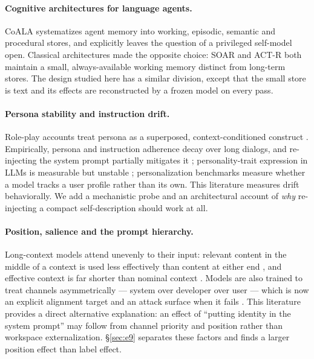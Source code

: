 \documentclass[11pt]{article}
\begin{document}
\paragraph{Cognitive architectures for language agents.} CoALA \citep{sumers2024coala} systematizes agent memory into working, episodic, semantic and procedural stores, and explicitly leaves the question of a privileged self-model open. Classical architectures made the opposite choice: SOAR \citep{laird2012soar} and ACT-R \citep{anderson2004actr} both maintain a small, always-available working memory distinct from long-term stores. The design studied here has a similar division, except that the small store is text and its effects are reconstructed by a frozen model on every pass.

\paragraph{Persona stability and instruction drift.} Role-play accounts treat persona as a superposed, context-conditioned construct \citep{shanahan2023}. Empirically, persona and instruction adherence decay over long dialogs, and re-injecting the system prompt partially mitigates it \citep{li2024stability}; personality-trait expression in LLMs is measurable but unstable \citep{serapio2023personality,jiang2024personallm}; personalization benchmarks \citep{salemi2024lamp} measure whether a model tracks a user profile rather than its own. This literature measures drift behaviorally. We add a mechanistic probe and an architectural account of \emph{why} re-injecting a compact self-description should work at all.

\paragraph{Position, salience and the prompt hierarchy.} Long-context models attend unevenly to their input: relevant content in the middle of a context is used less effectively than content at either end \citep{liu2024lost}, and effective context is far shorter than nominal context \citep{hsieh2024ruler}. Models are also trained to treat channels asymmetrically --- system over developer over user --- which is now an explicit alignment target \citep{wallace2024hierarchy} and an attack surface when it fails \citep{greshake2023injection}. This literature provides a direct alternative explanation: an effect of ``putting identity in the system prompt'' may follow from channel priority and position rather than workspace externalization. \S\ref{sec:e9} separates these factors and finds a larger position effect than label effect.
\end{document}
